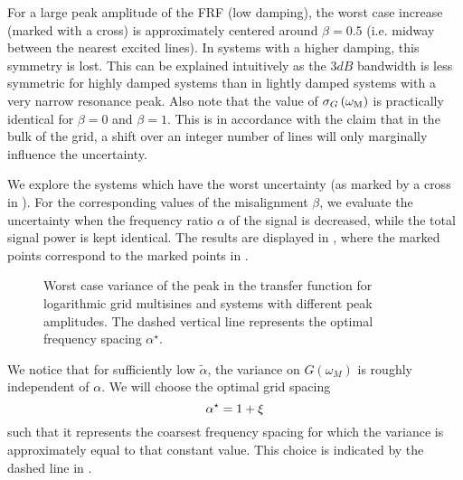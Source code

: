   For a large peak amplitude of the \gls{FRF} (low damping), the worst case increase (marked with a cross) is approximately centered around $\beta = 0.5$ (i.e. midway between the nearest excited lines).
  In systems with a higher damping, this symmetry is lost.
  This can be explained intuitively as the $3\unit{dB}$ bandwidth is less symmetric for highly damped systems than in lightly damped systems with a very narrow resonance peak.
  Also note that the value of $\sigma_G\left(\omega_{\mathrm{M}} \right)$ is practically identical for $\beta=0$ and $\beta=1$.
  This is in accordance with the claim that in the bulk of the grid, a shift over an integer number of lines will only marginally influence the uncertainty.
  
  We explore the systems which have the worst uncertainty (as marked by a cross in ).
  For the corresponding values of the misalignment $\beta$, we evaluate the uncertainty when the frequency ratio $\alpha$ of the signal is decreased, while the total signal power is kept identical.
  The results are displayed in , where the marked points correspond to the marked points in .
  
  \begin{figure}[ht]
    \centering
      \setlength{}
      \setlength\figureheight{0.68\figurewidth}
    
    \caption[Worst-case variance $\sigma_G^2\left( \wM \right)$ as a function of the frequency ratio $\alpha$.]{Worst case variance of the peak in the transfer function for logarithmic
             grid multisines and systems with different peak amplitudes.
             The dashed vertical line represents the optimal frequency spacing $\alpha^{\star}$.}
    \label{fig:excitation:worstCaseAlpha}
  \end{figure}

  We notice that for sufficiently low $\tilde{\alpha}$, the variance on $G\left( \omega_M \right)$ is roughly independent of $\alpha$.
  We will choose the optimal grid spacing
  \begin{equation}
    \alpha^{\star} = 1 + \xi_{}
    \label{eq:excitation:optimAlpha}
  \end{equation}
  such that it represents the coarsest frequency spacing for which the variance is approximately equal to that constant value.
  This choice is indicated by the dashed line in .


